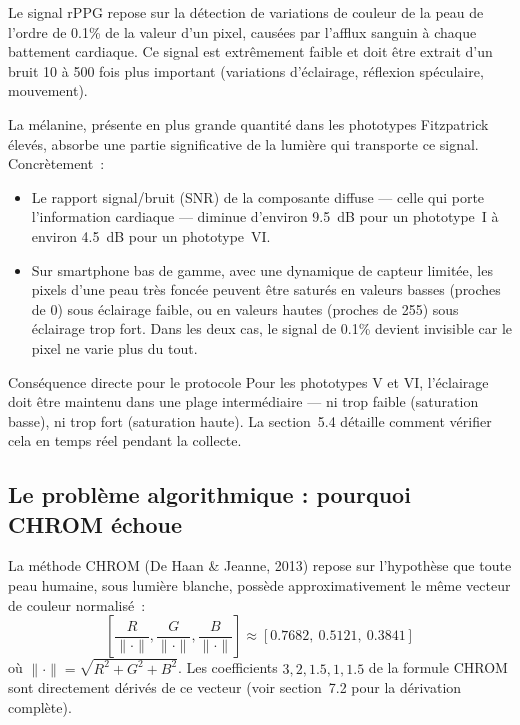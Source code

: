 \documentclass[11pt,a4paper]{article}
\begin{document}
Le signal rPPG repose sur la d\'etection de variations de couleur de la peau
de l'ordre de 0.1\% de la valeur d'un pixel, caus\'ees par l'afflux sanguin
\`a chaque battement cardiaque. Ce signal est extr\^emement faible et doit
\^etre extrait d'un bruit 10 \`a 500 fois plus important (variations
d'\'eclairage, r\'eflexion sp\'eculaire, mouvement).

La m\'elanine, pr\'esente en plus grande quantit\'e dans les phototypes
Fitzpatrick \'elev\'es, absorbe une partie significative de la lumi\`ere qui
transporte ce signal. Concr\`etement~:

\begin{itemize}
\item Le rapport signal/bruit (SNR) de la composante diffuse --- celle qui
porte l'information cardiaque --- diminue d'environ 9.5~dB pour un phototype~I
\`a environ 4.5~dB pour un phototype~VI.
\item Sur smartphone bas de gamme, avec une dynamique de capteur limit\'ee,
les pixels d'une peau tr\`es fonc\'ee peuvent \^etre satur\'es en valeurs
basses (proches de 0) sous \'eclairage faible, ou en valeurs hautes
(proches de 255) sous \'eclairage trop fort. Dans les deux cas, le signal
de 0.1\% devient invisible car le pixel ne varie plus du tout.
\end{itemize}

\begin{warnbox}{Cons\'equence directe pour le protocole}
Pour les phototypes V et VI, l'\'eclairage doit \^etre maintenu dans une
plage interm\'ediaire --- ni trop faible (saturation basse), ni trop fort
(saturation haute). La section~5.4 d\'etaille comment v\'erifier cela en
temps r\'eel pendant la collecte.
\end{warnbox}

\subsection{Le probl\`eme algorithmique : pourquoi CHROM \'echoue}

La m\'ethode CHROM (De Haan \& Jeanne, 2013) repose sur l'hypoth\`ese que
toute peau humaine, sous lumi\`ere blanche, poss\`ede approximativement le
m\^eme vecteur de couleur normalis\'e~:
\[
\left[\frac{R}{\|\cdot\|}, \frac{G}{\|\cdot\|}, \frac{B}{\|\cdot\|}\right]
\approx [0.7682,\ 0.5121,\ 0.3841]
\]
o\`u $\|\cdot\| = \sqrt{R^2+G^2+B^2}$. Les coefficients $3, 2, 1.5, 1, 1.5$ de
la formule CHROM sont directement d\'eriv\'es de ce vecteur (voir
section~7.2 pour la d\'erivation compl\`ete).
\end{document}
